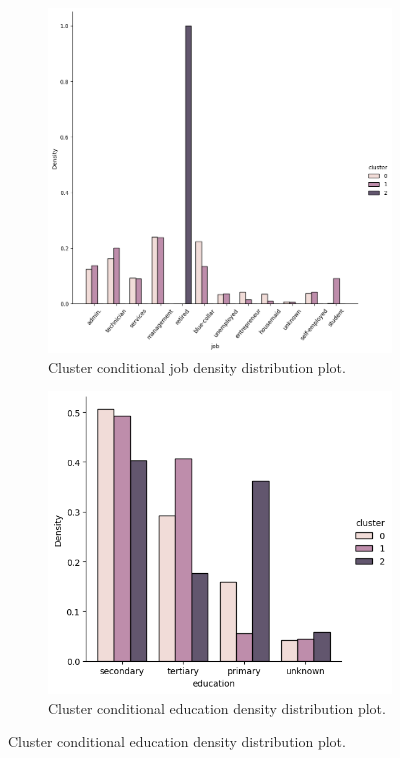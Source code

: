 \documentclass{article}
\begin{document}
\begin{enumerate}[leftmargin=\labelsep]
\begin{enumerate}
\begin{figure}[H]
  \begin{subfigure}{0.49\linewidth}
      \centering
      \includegraphics[width=\linewidth]{img/cluster-conditional-job-density.png}
      \caption{Cluster conditional job density distribution plot.}
  \end{subfigure}
  \begin{subfigure}{0.49\linewidth}
      \centering
      \includegraphics[width=\linewidth]{img/cluster-conditional-education-density.png}
      \caption{Cluster conditional education density distribution plot.}
  \end{subfigure}
\end{figure}


\end{enumerate}
\end{enumerate}
\end{document}
